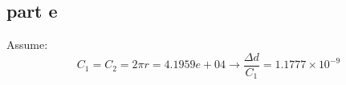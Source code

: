 \subsection{part e}
Assume:
$$C_1 = C_2 = 2\pi r = 4.1959e+04 \to \dfrac{\Delta d}{C_1} = 1.1777\times10^{-9}
$$ 